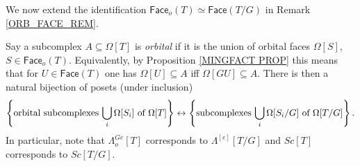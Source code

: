 \documentclass[a4paper,10pt
,draft
]{article}%
\begin{document}
\begin{remark}\label{ORB_HORN_REM}
We now extend the identification 
$\mathsf{Face}_o(T) \simeq \mathsf{Face}(T/G)$
in Remark \ref{ORB_FACE_REM}.

Say a subcomplex $A \subseteq \Omega[T]$ is \textit{orbital}
if it is the union of orbital faces $\Omega[S]$, $S\in \mathsf{Face}_o(T)$. 
Equivalently, by Proposition \ref{MINGFACT PROP} this means that for $U \in \mathsf{Face}(T)$
one has $\Omega[U] \subseteq A$ iff $\Omega[GU] \subseteq A$. There is then a natural bijection 
of posets (under inclusion)
\begin{equation}
	\left\{
	\text{orbital subcomplexes $\bigcup_i\Omega[S_i]$ of $\Omega[T]$}\right\}
		\leftrightarrow
	\left\{\text{subcomplexes $\bigcup_i\Omega[S_i/G]$ of $\Omega[T/G]$}\right\}.
\end{equation}
In particular, note that $\Lambda^{Ge}_o[T]$ corresponds to $\Lambda^{[e]}[T/G]$
and $Sc[T]$ corresponds to $Sc[T/G]$.
\end{remark}
\end{document}
